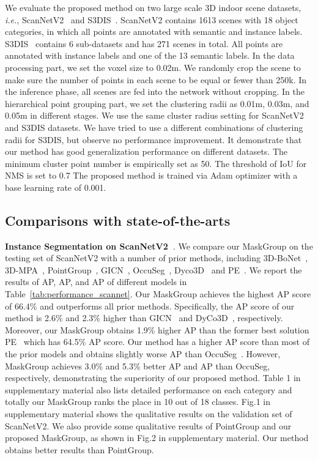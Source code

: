 \documentclass{article}
\newcommand{\ie}{\emph{i.e.}}
\begin{document}
We evaluate the proposed method on two large scale 3D indoor scene datasets, \ie, ScanNetV2~\cite{scannet} and S3DIS~\cite{s3dis}.
ScanNetV2 contains 1613 scenes with 18 object categories, in which all points are annotated with semantic and instance labels.
S3DIS~\cite{s3dis} contains 6 sub-datasets and has 271 scenes in total. All points are annotated with instance labels and one of the 13 semantic labels. 
In the data processing part, we set the voxel size to 0.02m. 
We randomly crop the scene to make sure the number of points in each scene to be equal or fewer than 250k.
In the inference phase, all scenes are fed into the network without cropping.
In the hierarchical point grouping part, we set the clustering radii  as 0.01m, 0.03m, and 0.05m in different stages. {We use the same cluster radius setting for ScanNetV2 and S3DIS datasets. We have tried to use a different combinations of clustering radii for S3DIS, but observe no performance improvement. It demonstrate that our method has good generalization performance on different datasets.}  The minimum cluster point number  is empirically set as 50. {The threshold of IoU for NMS is set to 0.7}
The proposed method is trained via Adam optimizer with a base learning rate of 0.001. 



\subsection{Comparisons with state-of-the-arts}
\textbf{Instance Segmentation on ScanNetV2~\cite{scannet}}. We compare our MaskGroup on the testing set of ScanNetV2 with a number of prior methods, including 3D-BoNet~\cite{3dbonet}, 3D-MPA~\cite{3dmpa}, PointGroup~\cite{pointgroup}, GICN~\cite{gicn}, OccuSeg~\cite{occseg}, Dyco3D~\cite{dyco} and PE~\cite{pe}. We report the results of AP, AP, and AP of different models in Table~\ref{tab:performance_scannet}. Our MaskGroup achieves the highest AP score of 66.4\% and outperforms all prior methods. 
Specifically, the AP score of our method is 2.6\% and 2.3\% higher than GICN~\cite{gicn} and DyCo3D~\cite{dyco}, respectively.
Moreover, our MaskGroup obtains 1.9\% higher AP than the former best solution PE~\cite{pe} which has 64.5\% AP score. 
Our method has a higher AP score than most of the prior models and obtains slightly worse AP than OccuSeg~\cite{occseg}. However, MaskGroup achieves 3.0\% and 5.3\% better AP and AP than OccuSeg, respectively, demonstrating the superiority of our proposed method. 
Table 1 in supplementary material also lists detailed performance on each category and totally our MaskGroup ranks the  place in 10 out of 18 classes. 
Fig.1 in supplementary material shows the qualitative results on the validation set of ScanNetV2.
We also provide some qualitative results of PointGroup and our proposed MaskGroup, as shown in Fig.2 in supplementary material. Our method obtains better results than PointGroup.
\end{document}
